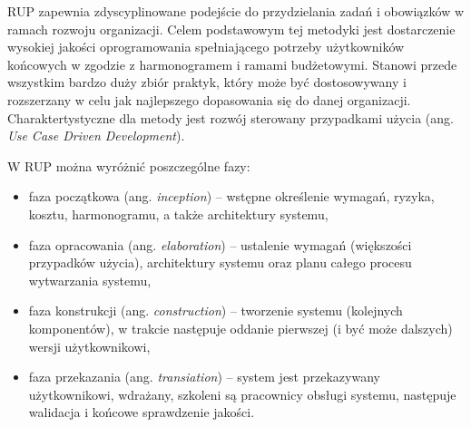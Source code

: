 RUP zapewnia zdyscyplinowane podejście do przydzielania zadań i obowiązków w ramach rozwoju organizacji. Celem podstawowym tej metodyki jest dostarczenie wysokiej jakości oprogramowania spełniającego potrzeby użytkowników końcowych w zgodzie z harmonogramem i ramami budżetowymi.
\cite{RUPIntRat} Stanowi przede wszystkim bardzo duży zbiór praktyk, który może być dostosowywany i rozszerzany w celu jak najlepszego dopasowania się do danej organizacji. Charaktertystyczne dla metody jest rozwój sterowany przypadkami użycia (ang. \textit{Use Case Driven Development}).\cite{RUPMartFow}

W RUP można wyróżnić poszczególne fazy:
\begin{itemize}
\item{faza początkowa (ang. \textit{inception}) – wstępne określenie wymagań, ryzyka, kosztu, harmonogramu, a także architektury systemu,}
\item{faza opracowania (ang. \textit{elaboration}) – ustalenie wymagań (większości przypadków użycia), architektury systemu oraz planu całego procesu wytwarzania systemu,}
\item{faza konstrukcji (ang. \textit{construction}) – tworzenie systemu (kolejnych komponentów), w trakcie następuje oddanie pierwszej (i być może dalszych) wersji użytkownikowi,}
\item{faza przekazania (ang. \textit{transiation}) – system jest przekazywany użytkownikowi, wdrażany, szkoleni są pracownicy obsługi systemu, następuje walidacja i końcowe sprawdzenie jakości.}\cite{RUPIntRat}
\end{itemize}
